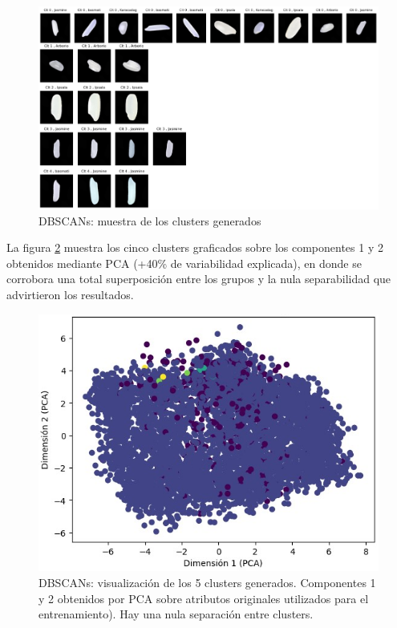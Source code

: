 \documentclass{article}
\begin{document}
\begin{figure} [!htb]
	\centering
	\includegraphics[height= 8.0 cm]{fg/DBSCAN_ejemplos_cluster.png}
	\caption{DBSCANs: muestra de los clusters generados}	
    \label{fg:DBSCAN_ejemplos_cluster}
\end{figure}

La figura \ref{fg:PCA_DBSCAN} muestra los cinco clusters graficados sobre los componentes 1 y 2 obtenidos mediante PCA (+40\% de variabilidad explicada), en donde se corrobora una total superposición entre los grupos y la nula separabilidad que advirtieron los resultados.

\begin{figure} [!htb]
	\centering
	\includegraphics[height= 8.0 cm]{fg/PCA_clusters_DBSCAN.png}
	\caption{DBSCANs: visualización de los 5 clusters generados. Componentes 1 y 2 obtenidos por PCA sobre atributos originales utilizados para el entrenamiento). Hay una nula separación entre clusters.}	
    \label{fg:PCA_DBSCAN}
\end{figure}
\end{document}
